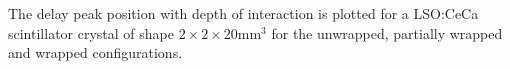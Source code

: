 \label{fig:centroidposition-20} The delay peak position with depth of interaction is plotted for a LSO:CeCa scintillator crystal of shape $2\times2\times20$mm$^3$ for the unwrapped, partially wrapped and wrapped configurations.